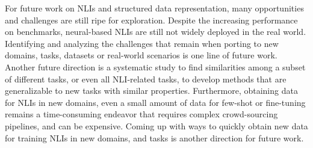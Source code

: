 \documentclass[11pt,dvipdfm]{article}
\begin{document}
For future work on NLIs and structured data representation, many opportunities and challenges are still  ripe for exploration. Despite the increasing performance on benchmarks, neural-based NLIs are still not widely deployed in the real world. Identifying and analyzing the challenges that remain when porting to  new domains, tasks, datasets or real-world scenarios is one line of future work.  Another future direction is a systematic study to find similarities among a subset of different tasks, or even all NLI-related tasks, to develop methods that are generalizable to new tasks with similar properties. Furthermore,  obtaining data for NLIs in new domains, even a small amount of data for few-shot or fine-tuning remains a time-consuming  endeavor that requires complex crowd-sourcing pipelines, and can be expensive.   Coming up with ways to quickly obtain new data for training NLIs in new domains, and tasks  is another direction for future work. 

\end{document}
